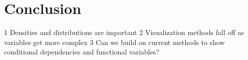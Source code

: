 \documentclass[letterpaper,onecolumn,titlepage]{Ythesis}
\begin{document}

\section{Conclusion}
\label{sec:conclusion}



1 Densities and distributions are important
2 Visualization methods fall off as variables get more
complex
3 Can we build on current methods to show conditional
dependencies and functional variables?


\printbibliography
\end{document}
